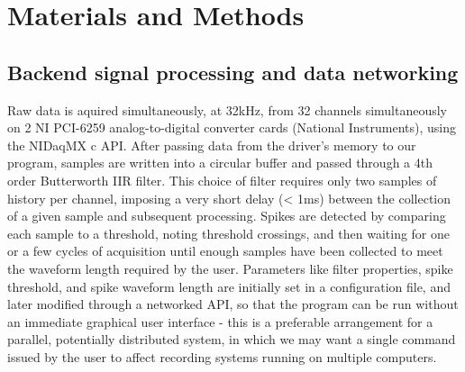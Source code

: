 \documentclass[10pt]{article}
\begin{document}
\section*{Materials and Methods}

\subsection*{Backend signal processing and data networking}
Raw data is aquired simultaneously, at 32kHz, from 32 channels simultaneously on 2 NI PCI-6259 analog-to-digital converter cards (National Instruments), using the NIDaqMX c API. After passing data from the driver's memory to our program, samples are written into a circular buffer and passed through a 4th order Butterworth IIR filter. This choice of filter requires only two samples of history per channel, imposing a very short delay (< 1ms) between the collection of a given sample and subsequent processing. Spikes are detected by comparing each sample to a threshold, noting threshold crossings, and then waiting for one or a few cycles of acquisition until enough samples have been collected to meet the waveform length required by the user. Parameters like filter properties, spike threshold, and spike waveform length are initially set in a configuration file, and later modified through a networked API, so that the program can be run without an immediate graphical user interface - this is a preferable arrangement for a parallel, potentially distributed system, in which we may want a single command issued by the user to affect recording systems running on multiple computers.
\end{document}
